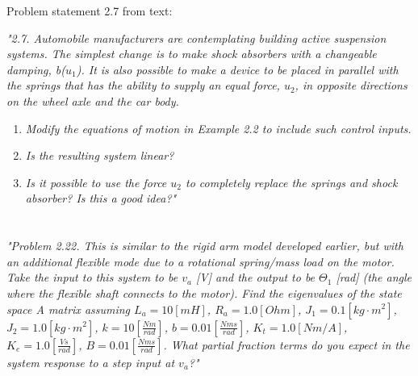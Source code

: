 \documentclass{article}
\begin{document}
Problem statement 2.7 from text:

\textit{
    "2.7. Automobile manufacturers are contemplating building active suspension systems. The simplest change is to make shock absorbers with a changeable damping, 
    b($u_1$). It is also possible to make a device to be placed in parallel with the springs that has the ability to supply an equal force, 
    $u_2$, in opposite directions on the wheel axle and the car body.
}
\begin{enumerate}[label=\alph*)]
    \item \textit{Modify the equations of motion in Example 2.2 to include such control inputs.}
    \item \textit{Is the resulting system linear?}
    \item \textit{Is it possible to use the force $u_2$ to completely replace the springs and shock absorber? Is this a good idea?"}
\end{enumerate}
    
   
\section{}

\textit{
    "Problem 2.22. This is similar to the rigid arm model developed earlier, but with an
    additional flexible mode due to a rotational spring/mass load on the motor. Take the input
    to this system to be $v_a$ [V] and the output to be $\Theta_1$ [rad] (the angle where the flexible
    shaft connects to the motor). Find the eigenvalues of the state space A matrix assuming
    $L_a = 10 [mH]$, $R_a = 1.0 [Ohm]$, $J_1 = 0.1 [kg \cdot m^2]$, $J_2 = 1.0 [kg \cdot m^2]$, $k = 10 [\frac{Nm}{rad}]$,
    $b = 0.01 [\frac{Nms}{rad}]$, $K_t = 1.0 [Nm/A]$, $K_e = 1.0 [\frac{Vs}{rad}]$, $B = 0.01 [\frac{Nms}{rad}]$. What partial
    fraction terms do you expect in the system response to a step input at $v_a$?"
}
\end{document}
